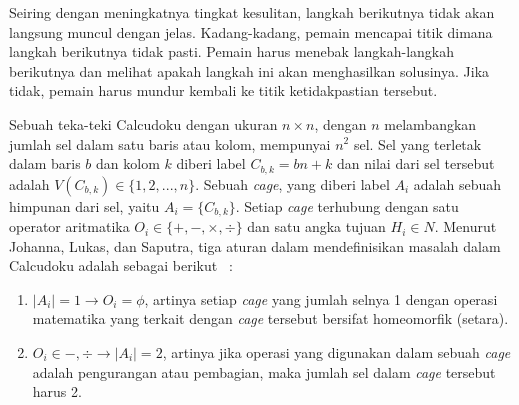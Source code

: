 \documentclass[a4paper,twoside]{article}
\begin{document}
\begin{enumerate}
Seiring dengan meningkatnya tingkat kesulitan, langkah berikutnya tidak akan langsung muncul dengan jelas. Kadang-kadang, pemain mencapai titik dimana langkah berikutnya tidak pasti. Pemain harus menebak langkah-langkah berikutnya dan melihat apakah langkah ini akan menghasilkan solusinya. Jika tidak, pemain harus mundur kembali ke titik ketidakpastian tersebut.

Sebuah teka-teki Calcudoku dengan ukuran \begin{math}n \times n\end{math}, dengan \begin{math}n\end{math} melambangkan jumlah sel dalam satu baris atau kolom, mempunyai \begin{math}n^2\end{math} sel. Sel yang terletak dalam baris \begin{math}b\end{math} dan kolom \begin{math}k\end{math} diberi label \begin{math}C_{b,k} = bn + k\end{math} dan nilai dari sel tersebut adalah \begin{math}V(C_{b,k}) \in \{1, 2, ..., n\}\end{math}. Sebuah \textit{cage}, yang diberi label \begin{math}A_i\end{math} adalah sebuah himpunan dari sel, yaitu \begin{math}A_i = \{C_{b,k}\}\end{math}. Setiap \textit{cage} terhubung dengan satu operator aritmatika \begin{math}O_i \in \{+, -, \times, \div\}\end{math} dan satu angka tujuan \begin{math}H_i \in N\end{math}. Menurut Johanna, Lukas, dan Saputra, tiga aturan dalam mendefinisikan masalah dalam Calcudoku adalah sebagai berikut ~\cite{JohannaLukasSaputra}:
\begin{enumerate}
\item \begin{math}|A_i| = 1 \rightarrow O_i = \phi\end{math}, artinya setiap \textit{cage} yang jumlah selnya 1 dengan operasi matematika yang terkait dengan \textit{cage} tersebut bersifat homeomorfik (setara).
\item \begin{math}O_i \in {-, \div} \rightarrow |A_i| = 2\end{math}, artinya jika operasi yang digunakan dalam sebuah \textit{cage} adalah pengurangan atau pembagian, maka jumlah sel dalam \textit{cage} tersebut harus 2.

\end{enumerate}
\end{enumerate}
\end{document}
